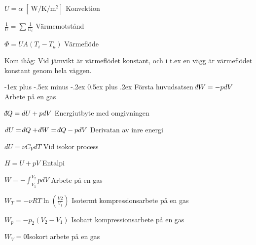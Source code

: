 \documentclass[10pt,landscape]{article}
\makeatletter
\newcommand{\unit}[1]{
\;[\SI{}{#1}]
}
\renewcommand{\section}{\@startsection{section}{1}{0mm}%
                                {-1ex plus -.5ex minus -.2ex}%
                                {0.5ex plus .2ex}%
                                {\normalfont\large\bfseries}
                                }
\def\dbar{{\mathchar'26\mkern-12mu d}}
\makeatother
\begin{document}
\begin{multicols}{3}
$U = \alpha \unit{\watt\per\kelvin\per\square\meter}$ \hfill Konvektion

$\frac{1}{U} = \sum \frac{1}{U_i}$ \hfill Värmemotstånd

$\Phi = UA \left(T_i - T_u \right)$ \hfill Värmeflöde
 
Kom ihåg: Vid jämvikt är värmeflödet konstant, och i t.ex en vägg är värmeflödet konstant genom hela väggen.

\section{Första huvudsatsen}
$\dbar W = -pdV$ \hfill Arbete på en gas

$\dbar Q = dU + pdV$ \hfill Energiutbyte med omgivningen

$dU = \dbar Q + \dbar W = \dbar Q - pdV$ \hfill Derivatan av inre energi

$dU = \nu C_V dT$ \hfill Vid isokor process

$H = U + pV$ \hfill Entalpi

$\displaystyle W = -\int_{V_1}^{V_2} pdV$ \hfill Arbete på en gas

$W_T = -\nu RT \ln \left(\frac{V2}{V_1}\right)$ \hfill Isotermt kompressionsarbete på en gas

$W_p = -p_2 (V_2 - V_1)$ \hfill Isobart kompressionsarbete på en gas

$W_V = 0$\hfill Isokort arbete på en gas



\end{multicols}
\end{document}
